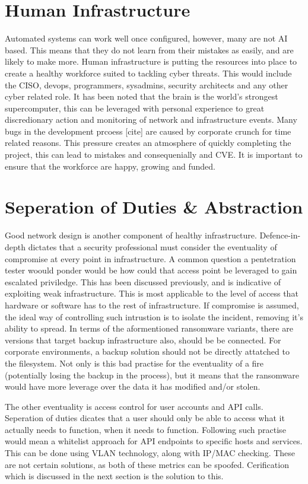\section{Human Infrastructure}
Automated systems can work well once configured, however, many are not AI based. This means that they do not learn from their mistakes as easily, and are likely to make more. Human infrastructure is putting the resources into place to create a healthy workforce suited to tackling cyber threats. This would include the CISO, devops, programmers, sysadmins, security architects and any other cyber related role.
It has been noted that the brain is the world's strongest supercomputer, this can be leveraged with personal experience to great discredionary action and monitoring of network and infrastructure events. Many bugs in the development prcoess [cite] are caused by corporate crunch for time related reasons. This pressure creates an atmosphere of quickly completing the project, this can lead to mistakes and consequenially and CVE.
It is important to ensure that the workforce are happy, growing and funded.


\section{Seperation of Duties & Abstraction}
Good network design is another component of healthy infrastructure. Defence-in-depth dictates that a security professional must consider the eventuality of compromise at every point in infrastructure. A common question a pentetration tester woould ponder would be how could that access point be leveraged to gain escalated priviledge. This has been discussed previously, and is indicative of exploiting weak infrastructure. 
This is most applicable to the level of access that hardware or software has to the rest of infrastructure. If compromise is assumed, the ideal way of controlling such intrustion is to isolate the incident, removing it's ability to spread. In terms of the aformentioned ransomware variants, there are versions that target backup infrastructure also, should be be connected. For corporate environments, a backup solution should not be directly attatched to the filesystem.
Not only is this bad practise for the eventuality of a fire (potentially losing the backup in the process), but it means that the ransomware would have more leverage over the data it has modified and/or stolen.

The other eventuality is access control for user accounts and API calls. Seperation of duties dicates that a user should only be able to access what it actually needs to function, when it needs to function. Following such practise would mean a whitelist approach for API endpoints to specific hosts and services.
This can be done using VLAN technology, along with IP/MAC checking. These are not certain solutions, as both of these metrics can be spoofed. Cerification which is discussed in the next section is the solution to this.

